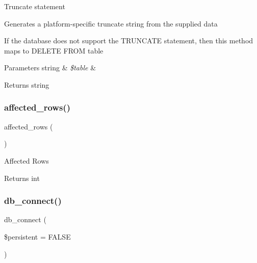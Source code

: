 Truncate statement

Generates a platform-\/specific truncate string from the supplied data

If the database does not support the T\+R\+U\+N\+C\+A\+TE statement, then this method maps to \textquotesingle{}D\+E\+L\+E\+TE F\+R\+OM table\textquotesingle{}


\begin{DoxyParams}[1]{Parameters}
string & {\em \$table} & \\
\hline
\end{DoxyParams}
\begin{DoxyReturn}{Returns}
string 
\end{DoxyReturn}
\mbox{\label{class_c_i___d_b__oci8__driver_a77248aaad33eb132c04cc4aa3f4bc8cb}} 
\subsubsection{\texorpdfstring{affected\+\_\+rows()}{affected\_rows()}}
{\footnotesize\ttfamily affected\+\_\+rows (\begin{DoxyParamCaption}{ }\end{DoxyParamCaption})}

Affected Rows

\begin{DoxyReturn}{Returns}
int 
\end{DoxyReturn}
\mbox{\label{class_c_i___d_b__oci8__driver_a52bf595e79e96cc0a7c907a9b45aeb4d}} 
\subsubsection{\texorpdfstring{db\+\_\+connect()}{db\_connect()}}
{\footnotesize\ttfamily db\+\_\+connect (\begin{DoxyParamCaption}\item[{}]{\$persistent = {\ttfamily FALSE} }\end{DoxyParamCaption})}

